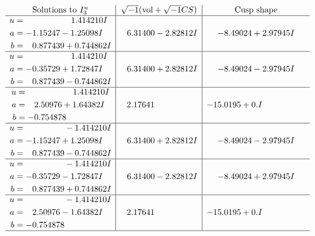 \documentclass[1p]{elsarticle_modified}
\theoremstyle{definition}
\newcommand{\I}{\sqrt{-1}}
\begin{document}
$$\begin{array}{c|c|c}  
\text{Solutions to }I^u_{3}& \I (\text{vol} + \sqrt{-1}CS) & \text{Cusp shape}\\
 \hline 
\begin{aligned}
u &= \phantom{-0.000000 -}1.414210 I \\
a &= -1.15247 - 1.25098 I \\
b &= \phantom{-}0.877439 + 0.744862 I\end{aligned}
 & \phantom{-}6.31400 - 2.82812 I & -8.49024 + 2.97945 I \\ \hline\begin{aligned}
u &= \phantom{-0.000000 -}1.414210 I \\
a &= -0.35729 + 1.72847 I \\
b &= \phantom{-}0.877439 - 0.744862 I\end{aligned}
 & \phantom{-}6.31400 + 2.82812 I & -8.49024 - 2.97945 I \\ \hline\begin{aligned}
u &= \phantom{-0.000000 -}1.414210 I \\
a &= \phantom{-}2.50976 + 1.64382 I \\
b &= -0.754878\phantom{ +0.000000I}\end{aligned}
 & \phantom{-}2.17641\phantom{ +0.000000I} & -15.0195 + 0. I\phantom{ +0.000000I} \\ \hline\begin{aligned}
u &= \phantom{-0.000000 } -1.414210 I \\
a &= -1.15247 + 1.25098 I \\
b &= \phantom{-}0.877439 - 0.744862 I\end{aligned}
 & \phantom{-}6.31400 + 2.82812 I & -8.49024 - 2.97945 I \\ \hline\begin{aligned}
u &= \phantom{-0.000000 } -1.414210 I \\
a &= -0.35729 - 1.72847 I \\
b &= \phantom{-}0.877439 + 0.744862 I\end{aligned}
 & \phantom{-}6.31400 - 2.82812 I & -8.49024 + 2.97945 I \\ \hline\begin{aligned}
u &= \phantom{-0.000000 } -1.414210 I \\
a &= \phantom{-}2.50976 - 1.64382 I \\
b &= -0.754878\phantom{ +0.000000I}\end{aligned}
 & \phantom{-}2.17641\phantom{ +0.000000I} & -15.0195 + 0. I\phantom{ +0.000000I}\\
 \hline 
 \end{array}$$\newpage\newpage\renewcommand{\arraystretch}{1}
\end{document}

